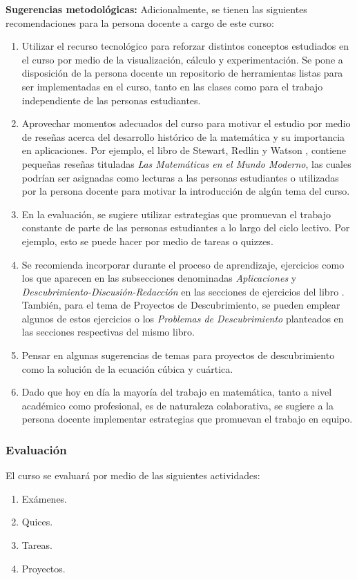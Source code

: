 \begin{refsection}
\textbf{Sugerencias metodológicas:} Adicionalmente, se tienen las siguientes recomendaciones para la persona docente a cargo de este curso:
\begin{enumerate}
    \item Utilizar el recurso tecnológico para reforzar distintos conceptos estudiados en el curso por medio de la visualización, cálculo y experimentación. Se pone a disposición de la persona docente un repositorio de herramientas listas para ser implementadas en el curso, tanto en las clases como para el trabajo independiente de las personas estudiantes.
    \item Aprovechar momentos adecuados del curso para motivar el estudio por medio de reseñas acerca del desarrollo histórico de la matemática y su importancia en aplicaciones. Por ejemplo, el libro de Stewart, Redlin y Watson \cite{SRW17}, contiene pequeñas reseñas tituladas \textit{Las Matemáticas en el Mundo Moderno}, las cuales podrían ser asignadas como lecturas a las personas estudiantes o utilizadas por la persona docente para motivar la introducción de algún tema del curso.
    \item En la evaluación, se sugiere utilizar estrategias que promuevan el trabajo constante de parte de las personas estudiantes a lo largo del ciclo lectivo. Por ejemplo, esto se puede hacer por medio de tareas o quizzes.
    \item Se recomienda incorporar durante el proceso de aprendizaje, ejercicios como los que aparecen en las subsecciones denominadas \textit{Aplicaciones} y \textit{Descubrimiento-Discusión-Redacción} en las secciones de ejercicios del libro \cite{SRW17}. También, para el tema de Proyectos de Descubrimiento, se pueden emplear algunos de estos ejercicios o los \textit{Problemas de Descubrimiento} planteados en las secciones respectivas del mismo libro.
    \item Pensar en algunas sugerencias de temas para proyectos de descubrimiento como la solución de la ecuación cúbica y cuártica.
    \item Dado que hoy en día la mayoría del trabajo en matemática, tanto a nivel académico como profesional, es de naturaleza colaborativa, se sugiere a la persona docente implementar estrategias que promuevan el trabajo en equipo.
\end{enumerate}

\subsubsection*{Evaluación}

El curso se evaluará por medio de las siguientes actividades:

\begin{enumerate}
\item Exámenes.
\item Quices.
\item Tareas.
\item Proyectos.
\end{enumerate}

\nocite{Apo84}
\nocite{Apo85} 
\nocite{SRW17}
\nocite{Ste18}

\printcursosbibliography
\end{refsection}
